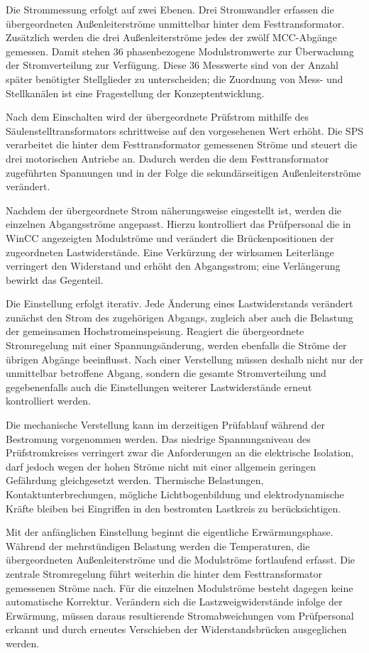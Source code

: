 Die Strommessung erfolgt auf zwei Ebenen. Drei Stromwandler erfassen die
übergeordneten Außenleiterströme unmittelbar hinter dem Festtransformator.
Zusätzlich werden die drei Außenleiterströme jedes der zwölf MCC-Abgänge
gemessen. Damit stehen 36 phasenbezogene Modulstromwerte zur Überwachung der
Stromverteilung zur Verfügung. Diese 36 Messwerte sind von der Anzahl später
benötigter Stellglieder zu unterscheiden; die Zuordnung von Mess- und
Stellkanälen ist eine Fragestellung der Konzeptentwicklung.

Nach dem Einschalten wird der übergeordnete Prüfstrom mithilfe des
Säulenstelltransformators schrittweise auf den vorgesehenen Wert erhöht. Die
SPS verarbeitet die hinter dem Festtransformator gemessenen Ströme und
steuert die drei motorischen Antriebe an. Dadurch werden die dem
Festtransformator zugeführten Spannungen und in der Folge die
sekundärseitigen Außenleiterströme verändert.

Nachdem der übergeordnete Strom näherungsweise eingestellt ist, werden die
einzelnen Abgangsströme angepasst. Hierzu kontrolliert das Prüfpersonal die
in WinCC angezeigten Modulströme und verändert die Brückenpositionen der
zugeordneten Lastwiderstände. Eine Verkürzung der wirksamen Leiterlänge
verringert den Widerstand und erhöht den Abgangsstrom; eine Verlängerung
bewirkt das Gegenteil.

Die Einstellung erfolgt iterativ. Jede Änderung eines Lastwiderstands
verändert zunächst den Strom des zugehörigen Abgangs, zugleich aber auch die
Belastung der gemeinsamen Hochstromeinspeisung. Reagiert die übergeordnete
Stromregelung mit einer Spannungsänderung, werden ebenfalls die Ströme der
übrigen Abgänge beeinflusst. Nach einer Verstellung müssen deshalb nicht nur
der unmittelbar betroffene Abgang, sondern die gesamte Stromverteilung und
gegebenenfalls auch die Einstellungen weiterer Lastwiderstände erneut
kontrolliert werden.

Die mechanische Verstellung kann im derzeitigen Prüfablauf während der
Bestromung vorgenommen werden. Das niedrige Spannungsniveau des
Prüfstromkreises verringert zwar die Anforderungen an die elektrische
Isolation, darf jedoch wegen der hohen Ströme nicht mit einer allgemein
geringen Gefährdung gleichgesetzt werden. Thermische Belastungen,
Kontaktunterbrechungen, mögliche Lichtbogenbildung und elektrodynamische
Kräfte bleiben bei Eingriffen in den bestromten Lastkreis zu
berücksichtigen.

Mit der anfänglichen Einstellung beginnt die eigentliche Erwärmungsphase.
Während der mehrstündigen Belastung werden die Temperaturen, die
übergeordneten Außenleiterströme und die Modulströme fortlaufend erfasst. Die
zentrale Stromregelung führt weiterhin die hinter dem Festtransformator
gemessenen Ströme nach. Für die einzelnen Modulströme besteht dagegen keine
automatische Korrektur. Verändern sich die Lastzweigwiderstände infolge der
Erwärmung, müssen daraus resultierende Stromabweichungen vom Prüfpersonal
erkannt und durch erneutes Verschieben der Widerstandsbrücken ausgeglichen
werden.

